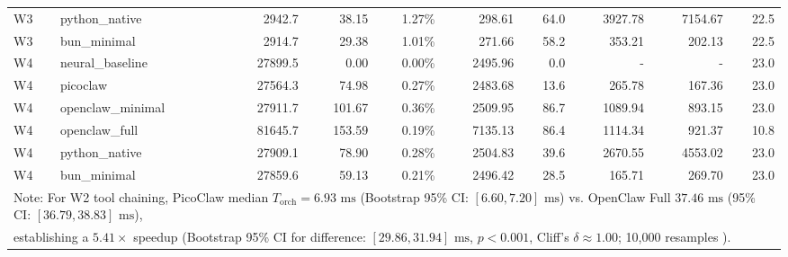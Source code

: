 \begin{table}[t]
\begin{tabular}{llrrrrrrrr}
W3 & python\_native & 2942.7 & 38.15 & 1.27\% & 298.61 & 64.0 & 3927.78 & 7154.67 & 22.5 \\
W3 & bun\_minimal & 2914.7 & 29.38 & 1.01\% & 271.66 & 58.2 & 353.21 & 202.13 & 22.5 \\
\midrule
W4 & neural\_baseline & 27899.5 & 0.00 & 0.00\% & 2495.96 & 0.0 & - & - & 23.0 \\
W4 & picoclaw & 27564.3 & 74.98 & 0.27\% & 2483.68 & 13.6 & 265.78 & 167.36 & 23.0 \\
W4 & openclaw\_minimal & 27911.7 & 101.67 & 0.36\% & 2509.95 & 86.7 & 1089.94 & 893.15 & 23.0 \\
W4 & openclaw\_full & 81645.7 & 153.59 & 0.19\% & 7135.13 & 86.4 & 1114.34 & 921.37 & 10.8 \\
W4 & python\_native & 27909.1 & 78.90 & 0.28\% & 2504.83 & 39.6 & 2670.55 & 4553.02 & 23.0 \\
W4 & bun\_minimal & 27859.6 & 59.13 & 0.21\% & 2496.42 & 28.5 & 165.71 & 269.70 & 23.0 \\
\midrule
\multicolumn{10}{l}{\footnotesize Note: For W2 tool chaining, PicoClaw median $T_{\text{orch}} = 6.93\text{ ms}$ (Bootstrap 95\% CI: $[6.60, 7.20]\text{ ms}$) vs. OpenClaw Full $37.46\text{ ms}$ (95\% CI: $[36.79, 38.83]\text{ ms}$),} \\
\multicolumn{10}{l}{\footnotesize establishing a $5.41\times$ speedup (Bootstrap 95\% CI for difference: $[29.86, 31.94]\text{ ms}$, $p < 0.001$, Cliff's $\delta \approx 1.00$; 10,000 resamples \cite{efron1979}).} \\
\bottomrule
\end{tabular}
\end{table}
